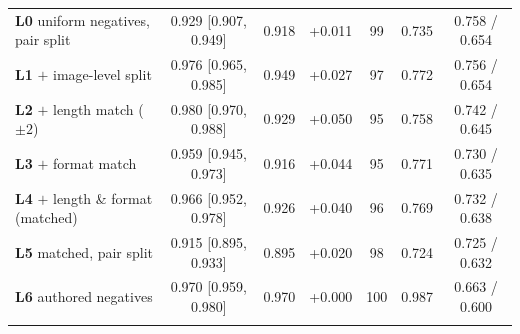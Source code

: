 {\begin{tabular}{lcccccc}
\textbf{L0} uniform negatives, pair split & 0.929 [0.907, 0.949] & 0.918 & +0.011 & 99 & 0.735 & 0.758 / 0.654 \\
\textbf{L1} $+$ image-level split & 0.976 [0.965, 0.985] & 0.949 & +0.027 & 97 & 0.772 & 0.756 / 0.654 \\
\textbf{L2} $+$ length match ($\pm2$) & 0.980 [0.970, 0.988] & 0.929 & +0.050 & 95 & 0.758 & 0.742 / 0.645 \\
\textbf{L3} $+$ format match & 0.959 [0.945, 0.973] & 0.916 & +0.044 & 95 & 0.771 & 0.730 / 0.635 \\
\textbf{L4} $+$ length \& format \;(matched) & 0.966 [0.952, 0.978] & 0.926 & +0.040 & 96 & 0.769 & 0.732 / 0.638 \\
\textbf{L5} matched, pair split & 0.915 [0.895, 0.933] & 0.895 & +0.020 & 98 & 0.724 & 0.725 / 0.632 \\
\textbf{L6} authored negatives & 0.970 [0.959, 0.980] & 0.970 & +0.000 & 100 & 0.987 & 0.663 / 0.600 \\
\addlinespace[2pt]
\bottomrule
\end{tabular}}
